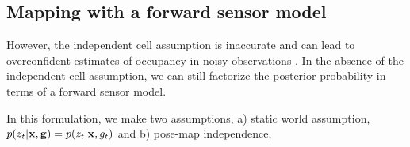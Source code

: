 \documentclass[letterpaper, 10 pt, conference]{ieeeconf} %
\begin{document}
\subsection{Mapping with a forward sensor model}
However, the independent cell assumption is inaccurate and can lead to
overconfident estimates of occupancy in noisy observations
\cite{thrun2003learning,merali2013icra}. In the absence of the independent cell
assumption, we can still factorize the posterior probability in terms of a
forward sensor model.

In this formulation, we make two assumptions, a) static world assumption, $p(z_t|\mathbf{x},
\mathbf{g}) = p(z_t|\mathbf{x}, g_t)$ and b) pose-map independence,
\end{document}
